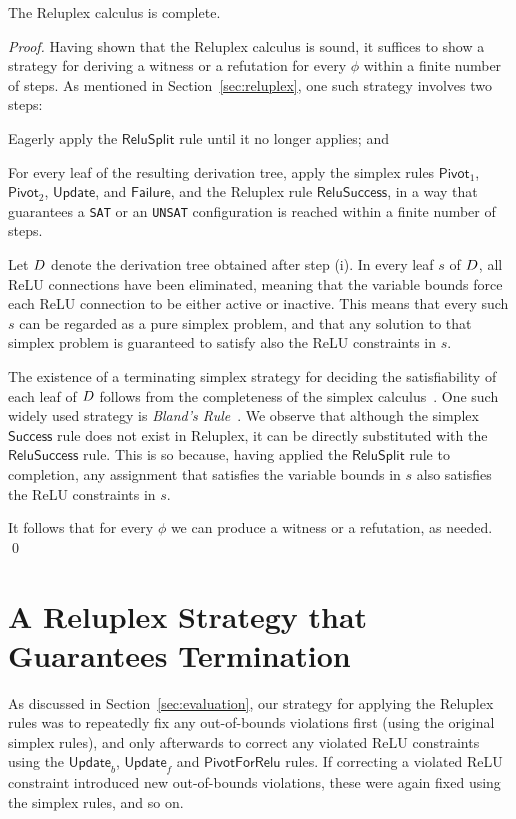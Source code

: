 \documentclass[a4paper]{llncs}
\newcommand{\sat}{\texttt{SAT}}
\newcommand{\unsat}{\texttt{UNSAT}}
\newcommand{\rulename}[1]{\ensuremath{\mathsf{#1}}\xspace}
\newcommand{\irulename}[2]{\ensuremath{\mathsf{#1}_{#2}}\xspace}
\newcommand{\pivot}[1]{\irulename{Pivot}{#1}}
\newcommand{\failure}{\rulename{Failure}}
\newcommand{\update}{\rulename{Update}}
\newcommand{\updateb}{\irulename{Update}{b}}
\newcommand{\updatef}{\irulename{Update}{f}}
\newcommand{\success}{\rulename{Success}}
\newcommand{\reluSuccess}{\rulename{ReluSuccess}}
\newcommand{\pivotForRelu}{\rulename{PivotForRelu}}
\newcommand{\reluSplit}{\rulename{ReluSplit}}
\begin{document}
\begin{claim}
The Reluplex calculus is complete.
\end{claim}
\begin{proof}
Having shown that the Reluplex calculus is sound, it suffices to show
a strategy for deriving a witness or a refutation 
for every 
 $\phi$ within a finite number of steps.
As mentioned in Section~\ref{sec:reluplex}, one such strategy involves two steps:
\begin{inparaenum}[(i)]
\item 
Eagerly apply the \reluSplit{} rule until it no longer applies; 
and
\item
 For every leaf of the resulting derivation tree, apply the simplex rules 
\pivot{1}, \pivot{2},
\update{}, and \failure{}, and the Reluplex rule \reluSuccess{}, in a way that guarantees a \sat{}
or an \unsat{} configuration is reached within a finite number of
steps.
\end{inparaenum}

Let $D$  denote the derivation tree obtained after
step (i). In every leaf $s$ of 
$D$,
all ReLU connections have been eliminated, meaning that the variable
bounds force each ReLU connection to be either active or inactive. 
 This means that
every such $s$ can be regarded as a pure
simplex problem, and that any solution to that simplex problem is
guaranteed to satisfy also the ReLU constraints in $s$.

The existence of a terminating simplex strategy for
deciding the satisfiability of each leaf of $D$
 follows from the completeness of the simplex calculus~\cite{Va96}. One such
widely used strategy is \emph{Bland's Rule}~\cite{Va96}. We observe
that although the simplex \success{} rule does not exist in Reluplex,
it can be directly substituted with the \reluSuccess{} rule. This is
so because, having applied the \reluSplit{} rule to completion, any assignment that satisfies
the variable bounds in $s$ also satisfies the ReLU constraints in $s$.

It follows that for every
$\phi$ we can produce a witness or a refutation, as needed.
\qed
\end{proof}

\section{A Reluplex Strategy that Guarantees Termination}
\label{appendix:termination}
As discussed in Section~\ref{sec:evaluation}, our strategy for
applying the Reluplex rules was
to repeatedly fix any out-of-bounds violations first (using the
original simplex rules),
and only afterwards to correct any violated ReLU constraints using the
\updateb{}, \updatef{} and \pivotForRelu{} rules. If correcting a
violated ReLU constraint introduced new out-of-bounds violations, these
were again fixed using the simplex rules, and so on.
\end{document}
